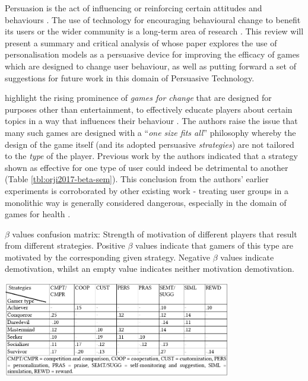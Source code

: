 \documentclass[11pt]{article}
\begin{document}
Persuasion is the act of influencing or reinforcing certain attitudes and behaviours \citep{khaled2008}. The use of technology for encouraging behavioural change to benefit its users or the wider community is a long-term area of research \citep{fogg2002}. This review will present a summary and critical analysis of \citet{orji2017} whose paper explores the use of personalisation models as a persuasive device for improving the efficacy of games which are designed to change user behaviour, as well as putting forward a set of suggestions for future work in this domain of Persuasive Technology.

\citet{orji2017} highlight the rising prominence of \textit{games for change} that are designed for purposes other than entertainment, to effectively educate players about certain topics in a way that influences their behaviour \citep{busch2015}. The authors raise the issue that many such games are designed with a ``\textit{one size fits all}'' philosophy whereby the design of the game itself (and its adopted persuasive \textit{strategies}) are not tailored to the \textit{type} of the player. Previous work by the authors indicated that a strategy shown as effective for one type of user could indeed be detrimental to another \citep{orji2013} (Table \ref{tbl:orji2017-beta-sem}). This conclusion from the authors' earlier experiments is corroborated by other existing work - treating user groups in a monolithic way is generally considered dangerous, especially in the domain of games for health \citep{berkovsky2010}. 

\begin{table}[H]
\centering
\caption{$\beta$ values confusion matrix: Strength of motivation of different players that result from different strategies. Positive $\beta$ values indicate that gamers of this type are motivated by the corresponding given strategy. Negative $\beta$ values indicate demotivation, whilst an empty value indicates neither motivation demotivation.
}\label{tbl:orji2017-beta-sem}
\includegraphics[width=0.75\textwidth]{img/orji2017-beta-sem.png} 
\end{table}
\end{document}
